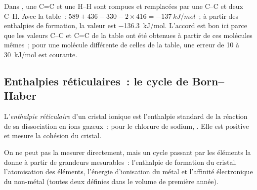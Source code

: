 \begin{example}\label{ex:b2:reaction-enthalpy:hydrogenation}
Dans , une C=C et une H--H sont rompues et
remplacées par une C--C et deux C--H. Avec la table~: $589 + 436 - 330 - 2
\times 416 = \qty{-137}{kJ/mol}$~; à partir des enthalpies de formation, la valeur est
\qty{-136.3}{kJ/mol}. L'accord est bon ici parce que les valeurs C--C
et C=C de la table ont été obtenues à partir de ces molécules mêmes~; pour une molécule
différente de celles de la table, une erreur de 10 à \qty{30}{kJ/mol} est courante.
\end{example}

\subsection*{Enthalpies réticulaires~: le cycle de Born--Haber}

\begin{definition}\label{def:b2:reaction-enthalpy:lattice-enthalpy}
L'\emph{enthalpie réticulaire} d'un cristal ionique est
l'enthalpie standard de la réaction de sa dissociation en ions gazeux~: pour le
chlorure de sodium, . Elle est positive et
mesure la cohésion du cristal.
\end{definition}

On ne peut pas la mesurer directement, mais un cycle passant par les éléments la donne
à partir de grandeurs mesurables~: l'enthalpie de formation du cristal,
l'atomisation des éléments, l'énergie d'ionisation du métal et
l'affinité électronique du non-métal (toutes deux définies dans le volume de première année).

